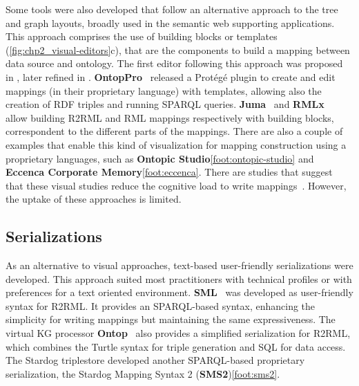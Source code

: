 
Some tools were also developed that follow an alternative approach to the tree and graph layouts, broadly used in the semantic web supporting applications. 
This approach comprises the use of building blocks or templates (\cref{fig:chp2_visual-editors}c), that are the components to build a mapping between data source and ontology. 
The first editor following this approach was proposed in \cite{sengupta2013editing}, later refined in \cite{pinkel2014best}. 
\textbf{OntopPro}~\parencite{calvanese2017ontop} released a Protégé plugin to create and edit mappings (in their proprietary language) with templates, allowing also the creation of RDF triples and running SPARQL queries. 
\textbf{Juma}~\parencite{junior2017juma} and \textbf{RMLx}~\parencite{aryan2017rmlx} allow building R2RML and RML mappings respectively with building blocks, correspondent to the different parts of the mappings. 
There are also a couple of examples that enable this kind of visualization for mapping construction using a proprietary languages, such as \textbf{Ontopic Studio}\cref{foot:ontopic-studio} and \textbf{Eccenca Corporate Memory}\cref{foot:eccenca}. 
There are studies that suggest that these visual studies reduce the cognitive load to write mappings~\parencite{junior2018mental}. However, the uptake of these approaches is limited. 



\subsection{Serializations}
\label{sec:chp2_serializations}

As an alternative to visual approaches, text-based user-friendly serializations were developed. This approach suited most practitioners with technical profiles or with preferences for a text oriented environment. 
\textbf{SML}~\parencite{Stadler2015sml} was developed as user-friendly syntax for R2RML. It provides an SPARQL-based syntax, enhancing the simplicity for writing mappings but maintaining the same expressiveness. 
The virtual KG processor \textbf{Ontop}~\parencite{calvanese2017ontop} also provides a simplified serialization for R2RML, which combines the Turtle syntax for triple generation and SQL for data access. 
The Stardog triplestore developed another SPARQL-based proprietary serialization, the Stardog Mapping Syntax 2 (\textbf{SMS2})\cref{foot:sms2}. 

